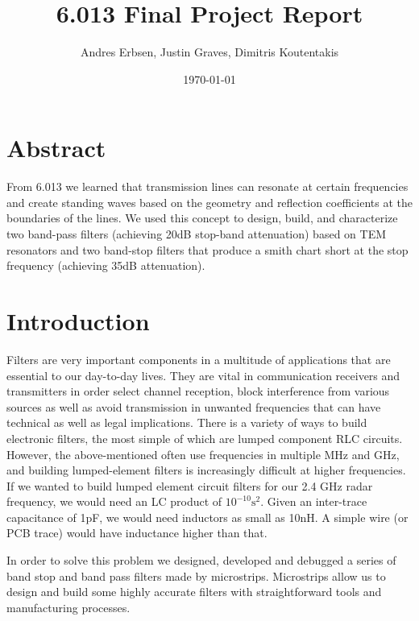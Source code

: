 \documentclass[letterpaper, 11pt, twocolumn]{article}
\begin{document}
\title{\vspace{-10mm} 6.013 Final Project Report}
\author{Andres Erbsen, Justin Graves, Dimitris Koutentakis}
\date{\today}
\maketitle
\vspace{5mm}
\section{Abstract}
From 6.013 we learned that transmission lines can resonate at certain
frequencies and create standing waves based on the geometry and reflection
coefficients at the boundaries of the lines. We used this concept to design,
build, and characterize two band-pass filters (achieving 20dB stop-band
attenuation) based on TEM resonators and two band-stop filters that produce a
smith chart short at the stop frequency (achieving 35dB attenuation).

\section {Introduction}
Filters are very important components in a multitude of applications that are
essential to our day-to-day lives. They are vital in communication receivers and
transmitters in order select channel reception, block interference from various
sources as well as avoid transmission in unwanted frequencies that can have
technical as well as legal implications.  There is a variety of ways to build
electronic filters, the most simple of which are lumped component RLC 
circuits. However, the above-mentioned often use frequencies in multiple MHz and
GHz, and building lumped-element filters is increasingly difficult at higher
frequencies.  If we wanted to build lumped
element circuit filters for our 2.4 GHz radar
frequency, we would need an LC product of $10^{-10}\text{s}^2$. Given an
inter-trace capacitance of 1pF, we would need inductors as small as 10nH.
A simple wire (or PCB trace) would have inductance higher than that.

In order to solve this problem we designed, developed and debugged a series of
band stop and band pass filters made by microstrips. Microstrips allow us to
design and build some highly accurate filters with straightforward tools and
manufacturing processes.
\end{document}
